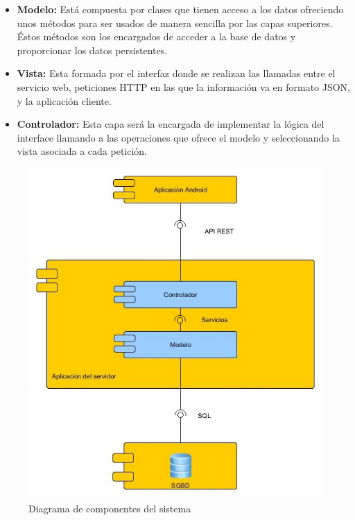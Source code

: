 \begin{itemize}
\item \textbf{Modelo:}
Está compuesta por clases que tienen acceso a los datos ofreciendo unos métodos para ser usados de manera sencilla por las capas superiores. Éstos métodos son los encargados de acceder a la base de datos y proporcionar los datos persistentes.
\item \textbf{Vista:}
Esta formada por el interfaz donde se realizan las llamadas entre el servicio web, peticiones HTTP en las que la información va en formato JSON, y la aplicación cliente.
\item \textbf{Controlador:}
Esta capa será la encargada de implementar la lógica del interface llamando a las operaciones que ofrece el modelo y seleccionando la vista asociada a cada petición.
\end{itemize}
\begin{figure}[H]
		\centering
		\includegraphics[width=\textwidth] {componentes.jpg}
		\caption{Diagrama de componentes del sistema }\label{fig:componentes}
	\end{figure}

